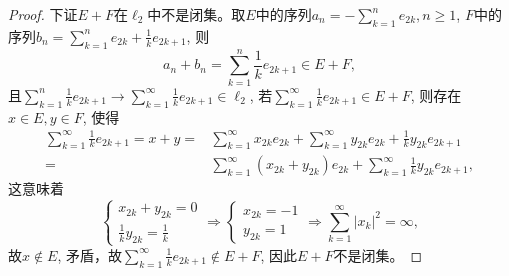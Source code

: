 \documentclass[a4paper,8pt]{ctexart}\textwidth 140mm \textheight 216mm
\newcommand{\8}{\infty}
\begin{document}
\begin{proof}
	下证$E+F$在$\ell_2$中不是闭集。取$E$中的序列$a_n=-\sum_{k=1}^n e_{2k},n\geq 1$, $F$中的序列$b_n=\sum_{k=1}^ne_{2k}+\frac{1}{k}e_{2k+1}$, 则
	$$a_n+b_n=\sum_{k=1}^n\frac{1}{k}e_{2k+1}\in E+F,$$
	且$\sum_{k=1}^n\frac{1}{k}e_{2k+1}\to \sum_{k=1}^\infty\frac{1}{k}e_{2k+1}\in\ell_2$, 若$\sum_{k=1}^\infty\frac{1}{k}e_{2k+1}\in E+F$, 则存在$x\in E,y\in F$, 使得
	\begin{equation*}
	\begin{split}
	\sum_{k=1}^\infty\frac{1}{k}e_{2k+1}=x+y=&\sum_{k=1}^\infty x_{2k}e_{2k}+\sum_{k=1}^\infty y_{2k}e_{2k}+\frac{1}{k}y_{2k}e_{2k+1}\\
	=&\sum_{k=1}^\infty (x_{2k}+y_{2k})e_{2k}+\sum_{k=1}^\infty \frac{1}{k}y_{2k}e_{2k+1},
	\end{split}	
	\end{equation*}
	这意味着
	\begin{equation*}
	\begin{cases}
	x_{2k}+y_{2k}=0\\
	\frac{1}{k}y_{2k}=\frac{1}{k}
	\end{cases}\Rightarrow 
	\begin{cases}
	x_{2k}=-1\\
	y_{2k}=1
	\end{cases}
	\Rightarrow \sum_{k=1}^\infty |x_k|^2=\infty,
	\end{equation*}
	故$x\notin E$, 矛盾，故$\sum_{k=1}^\infty \frac{1}{k}e_{2k+1}\notin E+F$, 因此$E+F$不是闭集。
\end{proof}



\end{document}

